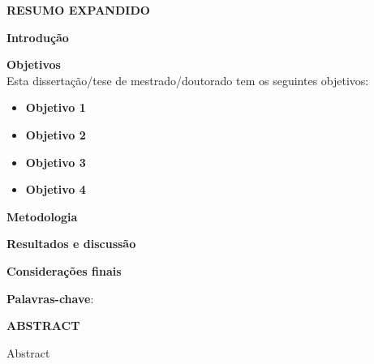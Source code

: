 \documentclass[12pt,a4paper,chapter=TITLE,section=TITLE]{article}
\numberwithin{equation}{subsection}
\numberwithin{figure}{subsection}
\numberwithin{table}{subsection}
\begin{document}
\begin{center}
	\textbf{\large RESUMO EXPANDIDO}
	\thispagestyle{empty}
\end{center}

\noindent \textbf{Introdução} \\


\vspace{1cm}

\noindent \textbf{Objetivos} \\

Esta dissertação/tese de mestrado/doutorado tem os seguintes objetivos:


\begin{itemize}
	\item \textbf{Objetivo 1}
	
	\item \textbf{Objetivo 2}
	
	\item \textbf{Objetivo 3}
	
	\item 	\textbf{Objetivo 4}
\end{itemize}

\vspace{1cm}

\noindent \textbf{Metodologia} \\


\vspace{1cm}

\noindent \textbf{Resultados e discussão} \\

\vspace{1cm}

\noindent \textbf{Considerações finais} \\


\vspace{6pt}

\noindent \textbf{Palavras-chave}: 

\thispagestyle{empty}
\newpage


\begin{center}
	\textbf{\large ABSTRACT}
\end{center}

Abstract
\end{document}
